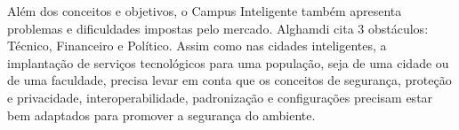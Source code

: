 Além dos conceitos e objetivos, o Campus Inteligente também apresenta problemas e dificuldades impostas pelo mercado. Alghamdi cita 3 obstáculos: Técnico, Financeiro e Político. Assim como nas cidades inteligentes, a implantação de serviços tecnológicos para uma população, seja de uma cidade ou de uma faculdade, precisa levar em conta que os conceitos de segurança, proteção e privacidade, interoperabilidade, padronização e configurações precisam estar bem adaptados para promover a segurança do ambiente.

